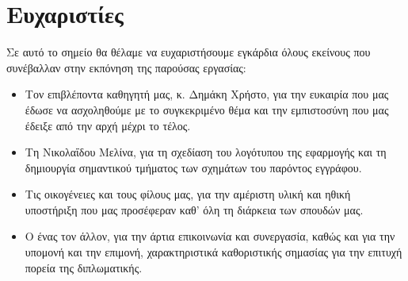 \chapter*{Ευχαριστίες}

Σε αυτό το σημείο θα θέλαμε να ευχαριστήσουμε εγκάρδια όλους εκείνους που συνέβαλλαν στην εκπόνηση της παρούσας εργασίας:

\begin{itemize}
	\item Τον επιβλέποντα καθηγητή μας, κ. Δημάκη Χρήστο, για την ευκαιρία που μας έδωσε να ασχοληθούμε με το συγκεκριμένο θέμα και την εμπιστοσύνη που μας έδειξε από την αρχή μέχρι το τέλος.
	\item Τη Νικολαΐδου Μελίνα, για τη σχεδίαση του λογότυπου της εφαρμογής και τη δημιουργία σημαντικού τμήματος των σχημάτων του παρόντος εγγράφου.
	\item Τις οικογένειες και τους φίλους μας, για την αμέριστη υλική και ηθική υποστήριξη που μας προσέφεραν καθ' όλη τη διάρκεια των σπουδών μας.
	\item Ο ένας τον άλλον, για την άρτια επικοινωνία και συνεργασία, καθώς και για την υπομονή και την επιμονή, χαρακτηριστικά καθοριστικής σημασίας για την επιτυχή πορεία της διπλωματικής.
\end{itemize}
